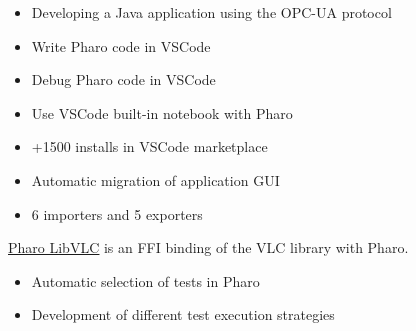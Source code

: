 \documentclass[10pt,a4paper,ragged2e,withhyper]{altacv}
\begin{document}
\divider


\begin{itemize}
  \item Developing a Java application using the OPC-UA protocol
\end{itemize}



\begin{itemize}
  \item Write Pharo code in VSCode
  \item Debug Pharo code in VSCode
  \item Use VSCode built-in notebook with Pharo
  \item +1500 installs in VSCode marketplace
\end{itemize}

\divider



\begin{itemize}
  \item Automatic migration of application GUI
  \item 6 importers and 5 exporters
\end{itemize}


\divider


\href{https://github.com/badetitou/Pharo-LibVLC}
{\color{blue}\underline{Pharo LibVLC}} is an FFI binding of the VLC library with Pharo.


\divider

\begin{itemize}
  \item Automatic selection of tests in Pharo
  \item Development of different test execution strategies
\end{itemize}



\divider
\end{document}
